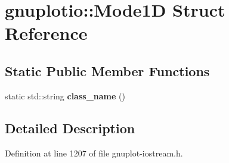 \hypertarget{structgnuplotio_1_1_mode1_d}{}\section{gnuplotio\+:\+:Mode1D Struct Reference}
\label{structgnuplotio_1_1_mode1_d}
\subsection*{Static Public Member Functions}
\begin{DoxyCompactItemize}
\item 
static std\+::string {\bfseries class\+\_\+name} ()\hypertarget{structgnuplotio_1_1_mode1_d_a508d170d84da4dfb7cd07eebad894b8f}{}\label{structgnuplotio_1_1_mode1_d_a508d170d84da4dfb7cd07eebad894b8f}

\end{DoxyCompactItemize}


\subsection{Detailed Description}


Definition at line 1207 of file gnuplot-\/iostream.\+h.

